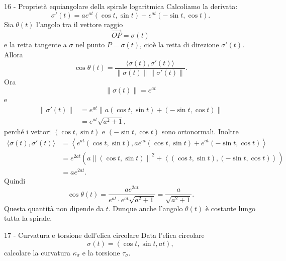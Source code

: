 \documentclass[a4paper]{article}
\begin{document}
\begin{snippetsolution}{16 - Proprietà equiangolare della spirale logaritmica}
    Calcoliamo la derivata:
    \[
        \sigma'(t)
        =
        ae^{at}(\cos t,\sin t)
        +
        e^{at}(-\sin t,\cos t).
    \]
    Sia \(\theta(t)\) l'angolo tra il vettore raggio
    \[
        \overrightarrow{OP}=\sigma(t)
    \]
    e la retta tangente a \(\sigma\) nel punto \(P=\sigma(t)\), cioè la retta di direzione \(\sigma'(t)\). Allora
    \[
        \cos\theta(t)
        =
        \frac{\langle\sigma(t),\sigma'(t)\rangle}{\left\|\sigma(t)\right\|\left\|\sigma'(t)\right\|}.
    \]
    Ora
    \[
        \left\|\sigma(t)\right\|=e^{at}
    \]
    e
    \begin{align*}
        \left\|\sigma'(t)\right\|
        &=
        e^{at}
        \left\|
            a(\cos t,\sin t)+(-\sin t,\cos t)
        \right\|\\
        &=
        e^{at}\sqrt{a^2+1},
    \end{align*}
    perché i vettori \((\cos t,\sin t)\) e \((-\sin t,\cos t)\) sono ortonormali. Inoltre
    \begin{align*}
        \langle\sigma(t),\sigma'(t)\rangle
        &=
        \left\langle
            e^{at}(\cos t,\sin t),
            ae^{at}(\cos t,\sin t)+e^{at}(-\sin t,\cos t)
        \right\rangle\\
        &=
        e^{2at}
        \left(
            a\left\|(\cos t,\sin t)\right\|^2
            +
            \left\langle
                (\cos t,\sin t),
                (-\sin t,\cos t)
            \right\rangle
        \right)\\
        &=
        ae^{2at}.
    \end{align*}
    Quindi
    \[
        \cos\theta(t)
        =
        \frac{ae^{2at}}{e^{at}\cdot e^{at}\sqrt{a^2+1}}
        =
        \frac{a}{\sqrt{a^2+1}}.
    \]
    Questa quantità non dipende da \(t\). Dunque anche l'angolo \(\theta(t)\) è costante lungo tutta la spirale.
\end{snippetsolution}

\begin{snippetexercise}{17 - Curvatura e torsione dell'elica circolare}
    Data l'elica circolare
    \[
        \sigma(t)=(\cos t,\sin t,at),
    \]
    calcolare la curvatura \(\kappa_\sigma\) e la torsione \(\tau_\sigma\).
\end{snippetexercise}
\end{document}

